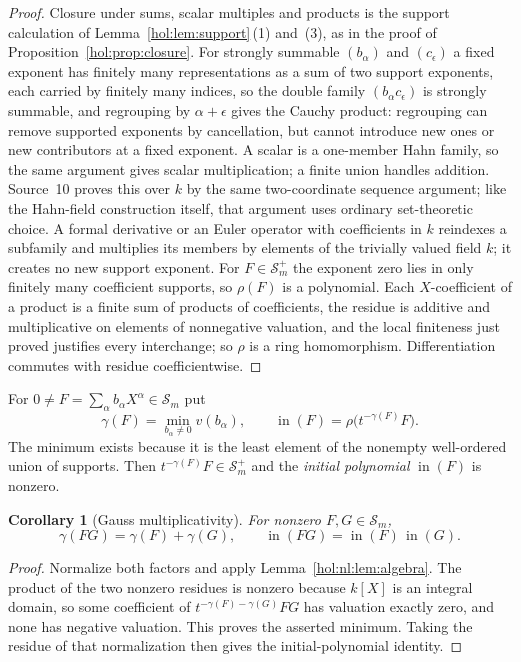 \documentclass[11pt]{article}
\numberwithin{equation}{section}
\newtheorem{corollary}[theorem]{Corollary}
\theoremstyle{definition}
\theoremstyle{remark}
\newcommand{\Sfam}{\mathcal S}
\newcommand{\inpoly}{\operatorname{in}}
\begin{document}
\begin{proof}
Closure under sums, scalar multiples and products is the support
calculation of Lemma~\ref{hol:lem:support}\,(1) and~(3), as in the proof of
Proposition~\ref{hol:prop:closure}. For strongly summable $(b_\alpha)$ and
$(c_\epsilon)$ a fixed exponent has finitely many representations as a sum of
two support exponents, each carried by finitely many indices, so the double
family $(b_\alpha c_\epsilon)$ is strongly summable, and regrouping by
$\alpha+\epsilon$ gives the Cauchy product: regrouping can remove supported
exponents by cancellation, but cannot introduce new ones or new contributors
at a fixed exponent. A scalar is a one-member Hahn family, so the same
argument gives scalar multiplication; a finite union handles addition.
Source~10 proves this over $k$ by
the same two-coordinate sequence argument; like the Hahn-field construction
itself, that argument uses ordinary set-theoretic choice. A formal derivative
or an Euler operator with coefficients in $k$ reindexes a subfamily and
multiplies its members by elements of the trivially valued field $k$; it
creates no new support exponent. For $F\in\Sfam_m^+$ the exponent zero lies
in only finitely many coefficient supports, so $\rho(F)$ is a polynomial. Each
$X$-coefficient of a product is a finite sum of products of coefficients, the
residue is additive and multiplicative on elements of nonnegative valuation,
and the local finiteness just proved justifies every interchange; so $\rho$ is
a ring homomorphism. Differentiation commutes with residue coefficientwise.
\end{proof}

For $0\ne F=\sum_\alpha b_\alpha X^\alpha\in\Sfam_m$ put
\[
 \gamma(F)=\min_{b_\alpha\ne0}v(b_\alpha),\qquad
 \inpoly(F)=\rho\bigl(t^{-\gamma(F)}F\bigr).
\]
The minimum exists because it is the least element of the nonempty
well-ordered union of supports. Then $t^{-\gamma(F)}F\in\Sfam_m^+$ and the
\emph{initial polynomial} $\inpoly(F)$ is nonzero.

\begin{corollary}[Gauss multiplicativity]\label{hol:nl:cor:gauss}
For nonzero $F,G\in\Sfam_m$,
\[
 \gamma(FG)=\gamma(F)+\gamma(G),\qquad
 \inpoly(FG)=\inpoly(F)\,\inpoly(G).
\]
\end{corollary}

\begin{proof}
Normalize both factors and apply Lemma~\ref{hol:nl:lem:algebra}. The product
of the two nonzero residues is nonzero because $k[X]$ is an integral domain,
so some coefficient of $t^{-\gamma(F)-\gamma(G)}FG$ has valuation exactly zero,
and none has negative valuation. This proves the asserted minimum. Taking
the residue of that normalization then gives the initial-polynomial identity.
\end{proof}
\end{document}
